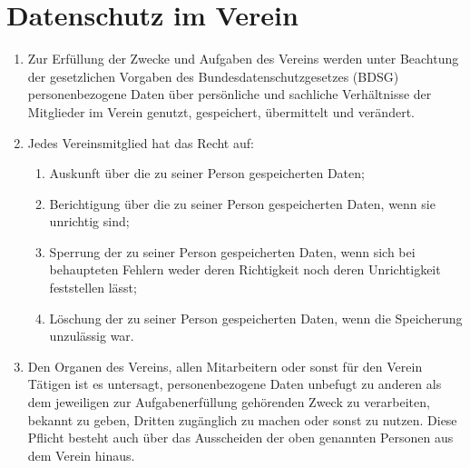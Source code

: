 \documentclass[a4paper,ngerman]{scrartcl}
\begin{document}
\section{Datenschutz im Verein}
\begin{enumerate}
\item Zur Erfüllung der Zwecke und Aufgaben des Vereins werden unter Beachtung der gesetzlichen Vorgaben des Bundesdatenschutzgesetzes (BDSG) personenbezogene Daten über persönliche und sachliche Verhältnisse der Mitglieder im Verein genutzt, gespeichert, übermittelt und verändert.
\item Jedes Vereinsmitglied hat das Recht auf:
\begin{enumerate}
\item Auskunft über die zu seiner Person gespeicherten Daten;
\item Berichtigung über die zu seiner Person gespeicherten Daten, wenn sie unrichtig sind;
\item Sperrung der zu seiner Person gespeicherten Daten, wenn sich bei behaupteten Fehlern weder deren Richtigkeit noch deren Unrichtigkeit feststellen lässt;
\item Löschung der zu seiner Person gespeicherten Daten, wenn die Speicherung unzulässig war.
\end{enumerate}
\item Den Organen des Vereins, allen Mitarbeitern oder sonst für den Verein Tätigen ist es untersagt, personenbezogene Daten unbefugt zu anderen als dem jeweiligen zur Aufgabenerfüllung gehörenden Zweck zu verarbeiten, bekannt zu geben, Dritten zugänglich zu machen oder sonst zu nutzen. Diese Pflicht besteht auch über das Ausscheiden der oben genannten Personen aus dem Verein hinaus.
\end{enumerate}
\end{document}
